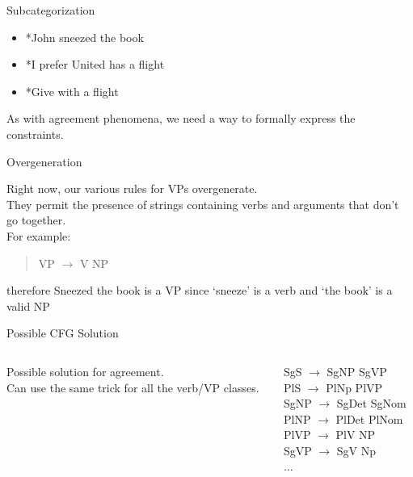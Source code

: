 \documentclass[9pt,xcolor=pdftex,dvipsnames,table]{beamer}
\begin{document}
\begin{frame}{Subcategorization}
\begin{itemize}
	\item *John sneezed the book
	\item *I prefer United has a flight
	\item *Give with a flight
\end{itemize}

As with agreement phenomena, we need a way to formally express the constraints.
\end{frame}

\begin{frame}{Overgeneration}

Right now, our various rules for VPs overgenerate.\\

They permit the presence of strings containing verbs and arguments that don't go together.\\
\vspace{.5cm}
For example:\\

\begin{quote}
	VP $\rightarrow$ V NP
\end{quote}

	therefore Sneezed the book is a VP since `sneeze' is a verb and `the book' is a valid NP
\end{frame}

\begin{frame}{Possible CFG Solution}
\begin{columns}[c] %
     \begin{column}[]{5.0cm} %
		Possible solution for agreement.\\
		\vspace{.5cm}
		Can use the same trick for all the verb/VP classes.
     \end{column}
     \begin{column}[]{5cm} %
		SgS $\rightarrow$ SgNP SgVP\\
		PlS $\rightarrow$ PlNp PlVP\\
		SgNP $\rightarrow$ SgDet SgNom\\
		PlNP $\rightarrow$ PlDet PlNom\\
		PlVP $\rightarrow$ PlV NP\\
		SgVP $\rightarrow$ SgV Np\\
		...
     \end{column}
\end{columns}
\end{frame}
\end{document}
